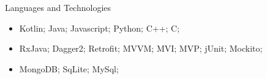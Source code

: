 \documentclass{mcdowellcv}
\begin{document}
	\begin{cvsection}{Languages and Technologies}
		\begin{cvsubsection}{}{}{}	
			\begin{itemize}
				\item Kotlin; Java; Javascript; Python; C++; C;
				\item RxJava; Dagger2; Retrofit; MVVM; MVI; MVP; jUnit; Mockito;
				\item MongoDB; SqLite; MySql;
			\end{itemize}
		\end{cvsubsection}
	\end{cvsection}
	
\end{document}
